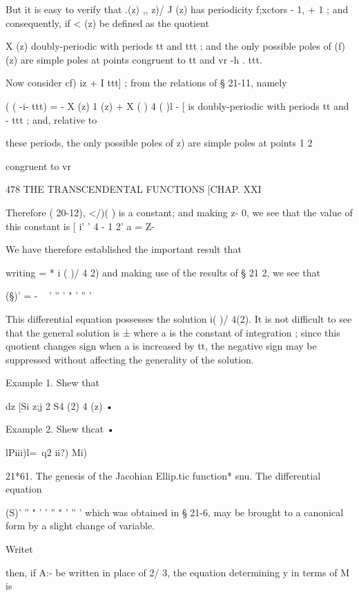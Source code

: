 But it is easy to verify that .(z) ,, z)/ J (z) has periodicity
f;xctors - 1, + 1 ; and consequently, if < (z) be defined as the
quotient

 X (z) %
doubly-periodic with periods tt and ttt ; and the only possible poles
of (f) (z) are simple poles at points congruent to tt and vr -h . ttt.

Now consider cf) iz + I ttt] ; from the relations of § 21-11, namely



( ( -i- ttt) = - X (z) 1 (z) + X ( ) 4 ( )l - [%
is doubly-periodic with periods tt and - ttt ; and, relative to

these periods, the only possible poles of z) are simple poles at
points 1 2

congruent to vr

478 THE TRANSCENDENTAL FUNCTIONS [CHAP. XXI

Therefore ( 20-12), </)( ) is a constant; and making z- 0, we see that
the value of this constant is [ i' ' 4 - 1 2' a = Z-

We have therefore established the important result that

writing = * i ( )/ 4 2) and making use of the results of § 21 2, we
see that

(§)' = - ~ ' '' ' " ' '' '

This differential equation possesses the solution i( )/ 4(2). It is
not difficult to see that the general solution is ±%
where a is the constant of integration ; since this quotient changes
sign when a is increased by tt, the negative sign may be suppressed
without affecting the generality of the solution.

Example 1. Shew that

dz [Si z;j 2 S4 (2) 4 (z) •

Example 2. Shew thcat •

lPiii)l=\ q2 ii?) Mi)

21*61. The genesis of the Jacohian Ellip.tic function* snu. The
differential equation

(S)' '' " ' ' '' " ' '' ' which was obtained in § 21-6, may be brought
to a canonical form by a slight change of variable.

Writet %

then, if A:- be written in place of 2/ 3, the equation determining y
in terms of M is

